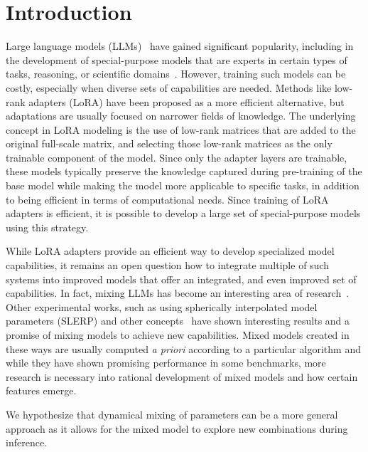 \section{Introduction}
Large language models (LLMs)~\cite{Vaswani2017AttentionNeedc,Touvron2023LlamaModels,OpenAI2023GPT-4Report,Chowdhery2022PaLM:Pathways,Jiang2023Mistral7B,Gunasekar2023TextbooksNeed} have gained significant popularity, including in the development of special-purpose models that are experts in certain types of tasks, reasoning, or scientific domains~\cite{Bubeck2023SparksGPT-4,Buehler2023MechGPTModalities,Nejjar2023LLMsAnalysis,Buehler2023GenerativeDesign,Luu2023BioinspiredLLM:Materials,Luu2023GenerativeSolvents,Buehler2023MeLMProblemsb,Ge2023OpenAGI:Experts}.
However, training such models can be costly, especially when diverse sets of capabilities are needed. Methods like low-rank adapters (LoRA)\cite{hu2021lora} have been proposed as a more efficient alternative, but adaptations are usually focused on narrower fields of knowledge.  The underlying concept in LoRA modeling is the use of low-rank matrices that are added to the original full-scale matrix, and selecting those low-rank matrices as the only trainable component of the model. Since only the adapter layers are trainable, these models typically preserve the knowledge captured during pre-training of the base model while making the model more applicable to specific tasks, in addition to being efficient in terms of computational needs. Since training of LoRA adapters is efficient, it is possible to develop a large set of special-purpose models using this strategy.

While LoRA adapters provide an efficient way to develop specialized model capabilities, it remains an open question how to integrate multiple of such systems into improved models that offer an integrated, and even improved set of capabilities. In fact, mixing LLMs has become an interesting area of research~\cite{Kim2023SOLARUp-Scaling}. Other experimental works, such as using spherically interpolated model parameters (SLERP) and other concepts~\cite{Arcee-ai/mergekit:Models.} have shown interesting results and a promise of mixing models to achieve new capabilities. Mixed models created in these ways are usually computed {\it a priori} according to a particular algorithm and while they have shown promising performance in some benchmarks, more research is necessary into rational development of mixed models and how certain features emerge. 

We hypothesize that dynamical mixing of parameters can be a more general approach as it allows for the mixed model to explore new combinations during inference.

